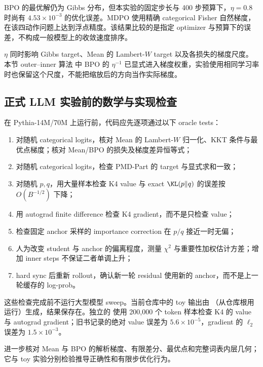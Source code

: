BPO 的最优解仍为 Gibbs 分布，但本实验的固定步长与 400 步预算下，$\eta=0.8$ 时尚有 $4.53\times10^{-3}$ 的优化误差。MDPO 使用精确 categorical Fisher 自然梯度，在该四动作问题上达到浮点精度。该结果比较的是指定 optimizer 与预算下的误差，不构成一般模型上的收敛速度排序。

$\eta$ 同时影响 Gibbs target、Mean 的 Lambert-$W$ target 以及各损失的梯度尺度。本节 outer--inner 算法 中 BPO 的 $\eta^{-1}$ 已显式进入梯度权重，实验使用相同学习率时也保留这个尺度，不能把缩放后的方向当作实际梯度。

\subsection{正式 LLM 实验前的数学与实现检查}

在 Pythia-14M/70M 上运行前，代码应先逐项通过以下 oracle tests：

\begin{enumerate}
\item 对随机 categorical logits，核对 Mean 的 Lambert-$W$ 归一化、KKT 条件与最优点梯度；核对 Mean/BPO 的损失及梯度差异恒等式；
\item 对随机 categorical logits，检查 PMD-Part 的  target 与显式求和一致；
\item 对随机 $p,q$，用大量样本检查 K4 value 与 exact $\KL(p\Vert q)$ 的误差按 $O(B^{-1/2})$ 下降；
\item 用 autograd finite difference 检查 K4 gradient，而不是只检查 value；
\item 检查固定 anchor 采样的 importance correction 在 $p/q$ 接近一时无偏；
\item 人为改变 student 与 anchor 的偏离程度，测量 $\chi^2$ 与重要性加权估计方差；增加 inner steps 不保证二者单调上升；
\item hard sync 后重新 rollout，确认新一轮 residual 使用新的 anchor，而不是上一轮缓存的 log-prob。
\end{enumerate}

这些检查完成前不运行大型模型 sweep。当前仓库中的 toy 输出由 （从仓库根用  运行）生成，结果保存在。独立的  使用 200,000 个 token 样本检查 K4 的 value 与 autograd gradient；旧书记录的绝对 value 误差为 $5.6\times10^{-5}$，gradient 的 $\ell_2$ 误差为 $1.5\times10^{-3}$。

 进一步核对 Mean 与 BPO 的解析梯度、有限差分、最优点和完整词表内层几何；它与 toy 实验分别检验推导正确性和有限步优化行为。

